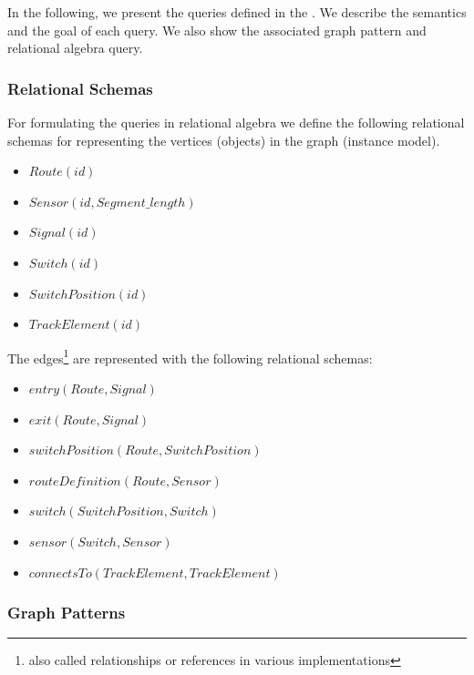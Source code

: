 In the following, we present the queries defined in the \tb{}. We describe the semantics and the goal of each query. We also show the associated graph pattern and relational algebra query.

\subsubsection{Relational Schemas}

For formulating the queries in relational algebra we define the following relational schemas for representing the vertices (objects) in the graph (instance model).

\begin{itemize}
  \item $ \mathit{Route}\left(\mathit{id}\right) $
  \item $ \mathit{Sensor}\left(\mathit{id}, \mathit{Segment\_length}\right) $
  \item $ \mathit{Signal}\left(\mathit{id}\right) $
  \item $ \mathit{Switch}\left(\mathit{id}\right) $
  \item $ \mathit{SwitchPosition}\left(\mathit{id}\right) $
  \item $ \mathit{TrackElement}\left(\mathit{id}\right) $
\end{itemize}

The edges\footnote{also called relationships or references in various implementations} are represented with the following relational schemas:

\begin{itemize}
  \item $ \mathit{entry}\left(\mathit{Route}, \mathit{Signal}\right) $
  \item $ \mathit{exit}\left(\mathit{Route}, \mathit{Signal}\right) $
  \item $ \mathit{switchPosition}\left(\mathit{Route}, \mathit{SwitchPosition}\right) $
  \item $ \mathit{routeDefinition}\left(\mathit{Route}, \mathit{Sensor}\right) $
  \item $ \mathit{switch}\left(\mathit{SwitchPosition}, \mathit{Switch}\right) $
  \item $ \mathit{sensor}\left(\mathit{Switch}, \mathit{Sensor}\right) $
  \item $ \mathit{connectsTo}\left(\mathit{TrackElement}, \mathit{TrackElement}\right) $
\end{itemize}

\subsubsection{Graph Patterns}

